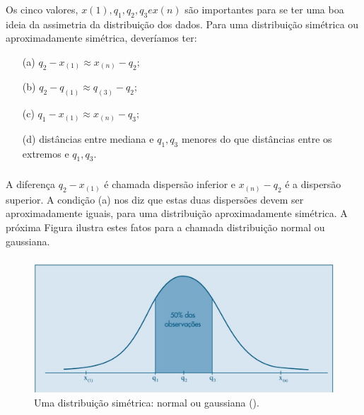 \documentclass[14pt,aspectratio=1610]{beamer}
\begin{document}
\begin{frame}{}
\frametitle{}
\begin{block}{}
\justifying
Os cinco valores, $x(1), q_{1}, q_{2}, q_{3} e x(n)$ são importantes para se ter uma boa ideia da assimetria da distribuição dos dados. Para uma distribuição simétrica 
ou aproximadamente simétrica, deveríamos ter:
\begin{enumerate}
\item[(a)] $q_{2}-x_{(1)}\approx x_{(n)}-q_{2};$
\item[(b)] $q_{2}-q_{(1)}\approx q_{(3)}-q_{2};$
\item[(c)] $q_{1}-x_{(1)}\approx x_{(n)}-q_{3};$
\item[(d)] distâncias entre mediana e $q_{1}, q_{3}$ menores do que distâncias entre os extremos e $q_{1}, q_{3}.$
\end{enumerate}
\end{block}
\end{frame}

\begin{frame}{}
\frametitle{}
\begin{block}{}
\justifying
A diferença $q_{2}- x_{(1)}$ é chamada dispersão inferior e $x_{(n)}-q_{2}$ é a dispersão superior.
A condição (a) nos diz que estas duas dispersões devem ser aproximadamente iguais, para uma distribuição 
aproximadamente simétrica. A próxima Figura ilustra estes fatos para a chamada distribuição normal ou gaussiana.
\end{block}
\end{frame}

\begin{frame}{}
\frametitle{}
\begin{block}{}
\justifying
\begin{figure}[H]
    \centering
    \includegraphics[scale=0.5]{Fig7}
    \caption{Uma distribuição simétrica: normal ou gaussiana (\cite{Morettin09}).}
    \label{Fig7_ex}
  \end{figure}
\end{block}
\end{frame}
\end{document}
